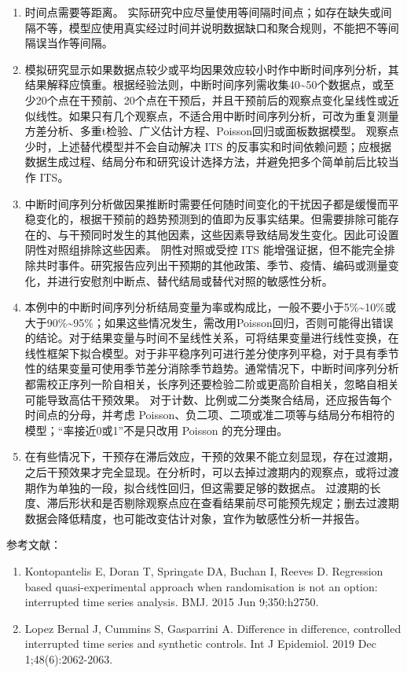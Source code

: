 \documentclass[
  chinese-hans,
  letterpaper,
  DIV=11,
  numbers=noendperiod]{scrreprt}
\begin{document}
\begin{enumerate}
\def\labelenumi{\arabic{enumi}.}
\item
  时间点需要等距离。
  实际研究中应尽量使用等间隔时间点；如存在缺失或间隔不等，模型应使用真实经过时间并说明数据缺口和聚合规则，不能把不等间隔误当作等间隔。
\item
  模拟研究显示如果数据点较少或平均因果效应较小时作中断时间序列分析，其结果解释应慎重。根据经验法则，中断时间序列需收集40\textasciitilde50个数据点，或至少20个点在干预前、20个点在干预后，并且干预前后的观察点变化呈线性或近似线性。如果只有几个观察点，不适合用中断时间序列分析，可改为重复测量方差分析、多重t检验、广义估计方程、Poisson回归或面板数据模型。
  观察点少时，上述替代模型并不会自动解决 ITS
  的反事实和时间依赖问题；应根据数据生成过程、结局分布和研究设计选择方法，并避免把多个简单前后比较当作
  ITS。
\item
  中断时间序列分析做因果推断时需要任何随时间变化的干扰因子都是缓慢而平稳变化的，根据干预前的趋势预测到的值即为反事实结果。但需要排除可能存在的、与干预同时发生的其他因素，这些因素导致结局发生变化。因此可设置阴性对照组排除这些因素。
  阴性对照或受控 ITS
  能增强证据，但不能完全排除共时事件。研究报告应列出干预期的其他政策、季节、疫情、编码或测量变化，并进行安慰剂中断点、替代结局或替代对照的敏感性分析。
\item
  本例中的中断时间序列分析结局变量为率或构成比，一般不要小于5\%\textasciitilde10\%或大于90\%\textasciitilde95\%；如果这些情况发生，需改用Poisson回归，否则可能得出错误的结论。对于结果变量与时间不呈线性关系，可将结果变量进行线性变换，在线性框架下拟合模型。对于非平稳序列可进行差分使序列平稳，对于具有季节性的结果变量可使用季节差分消除季节趋势。通常情况下，中断时间序列分析都需校正序列一阶自相关，长序列还要检验二阶或更高阶自相关，忽略自相关可能导致高估干预效果。
  对于计数、比例或二分类聚合结局，还应报告每个时间点的分母，并考虑
  Poisson、负二项、二项或准二项等与结局分布相符的模型；``率接近0或1''不是只改用
  Poisson 的充分理由。
\item
  在有些情况下，干预存在滞后效应，干预的效果不能立刻显现，存在过渡期，之后干预效果才完全显现。在分析时，可以去掉过渡期内的观察点，或将过渡期作为单独的一段，拟合线性回归，但这需要足够的数据点。
  过渡期的长度、滞后形状和是否剔除观察点应在查看结果前尽可能预先规定；删去过渡期数据会降低精度，也可能改变估计对象，宜作为敏感性分析一并报告。
\end{enumerate}

参考文献：

\begin{enumerate}
\def\labelenumi{\arabic{enumi}.}
\item
  Kontopantelis E, Doran T, Springate DA, Buchan I, Reeves D. Regression
  based quasi-experimental approach when randomisation is not an option:
  interrupted time series analysis. BMJ. 2015 Jun 9;350:h2750.
\item
  Lopez Bernal J, Cummins S, Gasparrini A. Difference in difference,
  controlled interrupted time series and synthetic controls. Int J
  Epidemiol. 2019 Dec 1;48(6):2062-2063.
\end{enumerate}
\end{document}
